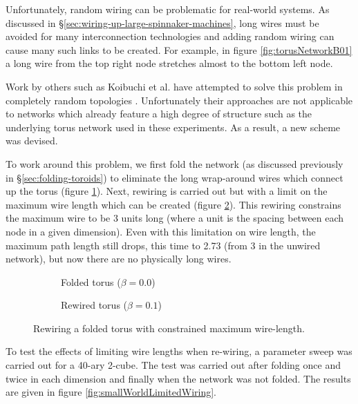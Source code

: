 			Unfortunately, random wiring can be problematic for real-world systems.
			As discussed in \S\ref{sec:wiring-up-large-spinnaker-machines}, long wires
			must be avoided for many interconnection technologies and adding random
			wiring can cause many such links to be created. For example, in figure
			\ref{fig:torusNetworkB01} a long wire from the top right node stretches
			almost to the bottom left node.
			
			Work by others such as Koibuchi et al. have attempted to solve this
			problem in completely random topologies \cite{koibuchi13}.  Unfortunately
			their approaches are not applicable to networks which already feature a
			high degree of structure such as the underlying torus network used in
			these experiments. As a result, a new scheme was devised.
			
			To work around this problem, we first fold the network (as discussed
			previously in \S\ref{sec:folding-toroids}) to eliminate the long
			wrap-around wires which connect up the torus (figure
			\ref{fig:torusNetworkFB0}). Next, rewiring is carried out but with a limit
			on the maximum wire length which can be created (figure
			\ref{fig:torusNetworkFB01}).  This rewiring constrains the maximum wire to
			be 3 units long (where a unit is the spacing between each node in a given
			dimension). Even with this limitation on wire length, the maximum path
			length still drops, this time to 2.73 (from 3 in the unwired network), but
			now there are no physically long wires.
			
			\begin{figure}
				\center
				\begin{subfigure}[t]{0.45\textwidth}
					\center
					
					\caption{Folded torus ($\beta=0.0$)}
					\label{fig:torusNetworkFB0}
				\end{subfigure}
				\begin{subfigure}[t]{0.45\textwidth}
					\center
					
					\caption{Rewired torus ($\beta=0.1$)}
					\label{fig:torusNetworkFB01}
				\end{subfigure}
				
				\caption{Rewiring a folded torus with constrained maximum wire-length.}
				\label{fig:torusNetworkF}
			\end{figure}
			
			To test the effects of limiting wire lengths when re-wiring, a parameter
			sweep was carried out for a 40-ary 2-cube. The test was carried out after
			folding once and twice in each dimension and finally when the
			network was not folded. The results are given in figure
			\ref{fig:smallWorldLimitedWiring}.
			
